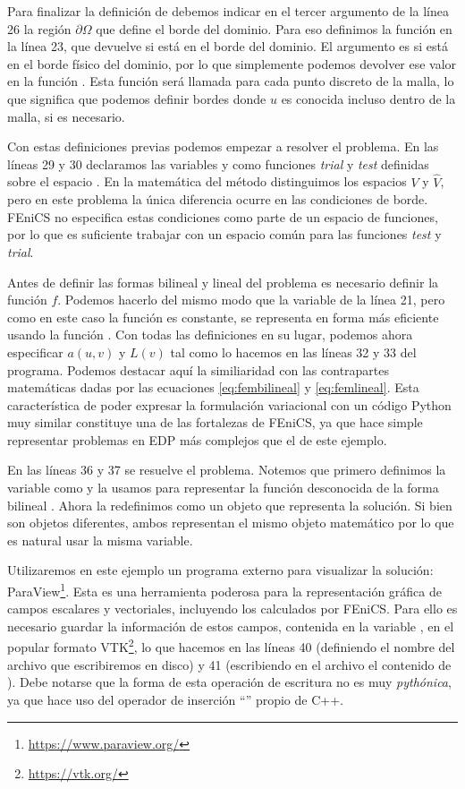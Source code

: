 Para finalizar la definición de  debemos indicar en el tercer argumento de la línea 26 la región $\partial \Omega$ que define el borde del dominio. Para eso definimos la función  en la línea 23, que devuelve  si  está en el borde del dominio. El argumento  es  si  está en el borde físico del dominio, por lo que simplemente podemos devolver ese valor en la función . Esta función será llamada para cada punto discreto de la malla, lo que significa que podemos definir bordes donde $u$ es conocida incluso dentro de la malla, si es necesario.

Con estas definiciones previas podemos empezar a resolver el problema. En las líneas 29 y 30 declaramos las variables  y  como funciones \textit{trial} y \textit{test} definidas sobre el espacio . En la matemática del método distinguimos los espacios $V$ y $\hat{V}$, pero en este problema la única diferencia ocurre en las condiciones de borde. FEniCS no especifica estas condiciones como parte de un espacio de funciones, por lo que es suficiente trabajar con un espacio común  para las funciones \textit{test} y \textit{trial}.

Antes de definir las formas bilineal y lineal del problema es necesario definir la función $f$. Podemos hacerlo del mismo modo que la variable  de la línea 21, pero como en este caso la función es constante, se representa en forma más eficiente usando la función . Con todas las definiciones en su lugar, podemos ahora especificar $a(u, v)$ y $L(v)$ tal como lo hacemos en las líneas 32 y 33 del programa. Podemos destacar aquí la similiaridad con las contrapartes matemáticas dadas por las ecuaciones \eqref{eq:fembilineal} y \eqref{eq:femlineal}. Esta característica de poder expresar la formulación variacional con un código Python muy similar constituye una de las fortalezas de FEniCS, ya que hace simple representar problemas en EDP más complejos que el de este ejemplo. 

En las líneas 36 y 37 se resuelve el problema. Notemos que primero definimos la variable  como  y la usamos para representar la función desconocida de la forma bilineal . Ahora la redefinimos como un objeto  que representa la solución. Si bien son objetos diferentes, ambos representan el mismo objeto matemático por lo que es natural usar la misma variable.

Utilizaremos en este ejemplo un programa externo para visualizar la solución: ParaView\footnote{\href{https://www.paraview.org/}{https://www.paraview.org/}}. Esta es una herramienta poderosa para la representación gráfica de campos escalares y vectoriales, incluyendo los calculados por FEniCS. Para ello es necesario guardar la información de estos campos, contenida en la variable , en el popular formato VTK\footnote{\href{https://vtk.org/}{https://vtk.org/}}, lo que hacemos en las líneas 40 (definiendo el nombre del archivo que escribiremos en disco) y 41 (escribiendo en el archivo el contenido de ). Debe notarse que la forma de esta operación de escritura no es muy \textit{pythónica}, ya que hace uso del operador de inserción ``\mip{<<}'' propio de C++.

